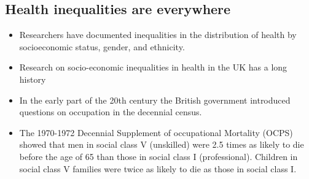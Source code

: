 \subsection{Health inequalities are everywhere}
\begin{itemize}
        \item Researchers have documented inequalities in the distribution of health by socioeconomic status, gender, and ethnicity.
        \item Research on socio-economic inequalities in health in the UK has a long history
        \item In the early part of the 20th century the British government introduced questions on occupation in the decennial census.
        \item The 1970-1972 Decennial Supplement of occupational Mortality (OCPS) showed that men in social class V (unskilled) were 2.5 times as likely to die before the age of 65 than those in social class I (professional). Children in social class V families were twice as likely to die as those in social class I.
\end{itemize} 

